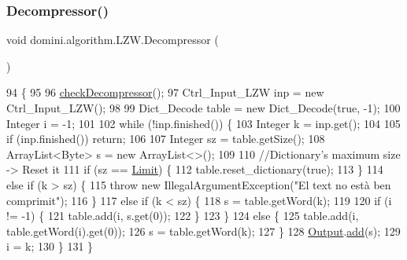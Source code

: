 \subsubsection{\texorpdfstring{Decompressor()}{Decompressor()}}
{\footnotesize\ttfamily void domini.\+algorithm.\+L\+Z\+W.\+Decompressor (\begin{DoxyParamCaption}{ }\end{DoxyParamCaption})\hspace{0.3cm}{\ttfamily [inline]}}


\begin{DoxyCode}
94                                \{
95 
96         \hyperlink{classdomini_1_1algorithm_1_1Algorithm_a6b738342cc7169893fa60d593f5a13db}{checkDecompressor}();
97         Ctrl\_Input\_LZW inp = \textcolor{keyword}{new} Ctrl\_Input\_LZW();
98         
99         Dict\_Decode table = \textcolor{keyword}{new} Dict\_Decode(\textcolor{keyword}{true}, -1);
100         Integer i = -1;
101         
102         \textcolor{keywordflow}{while} (!inp.finished()) \{
103             Integer k = inp.get();
104             
105             \textcolor{keywordflow}{if} (inp.finished()) \textcolor{keywordflow}{return};
106             
107             Integer sz = table.getSize();
108             ArrayList<Byte> s = \textcolor{keyword}{new} ArrayList<>();
109 
110             \textcolor{comment}{//Dictionary's maximum size -> Reset it}
111             \textcolor{keywordflow}{if} (sz == \hyperlink{classdomini_1_1algorithm_1_1LZW_a6d83dbcda4939db767fa0522d40fcc0a}{Limit}) \{ 
112                 table.reset\_dictionary(\textcolor{keyword}{true});
113             \}               
114             \textcolor{keywordflow}{else} \textcolor{keywordflow}{if} (k > sz) \{
115                 \textcolor{keywordflow}{throw} \textcolor{keyword}{new} IllegalArgumentException(\textcolor{stringliteral}{"El text no està ben comprimit"});
116             \}       
117             \textcolor{keywordflow}{else} \textcolor{keywordflow}{if} (k < sz) \{
118                 s = table.getWord(k);
119 
120                 \textcolor{keywordflow}{if} (i != -1) \{
121                     table.add(i, s.get(0));
122                 \}
123             \}
124             \textcolor{keywordflow}{else} \{
125                 table.add(i, table.getWord(i).get(0));
126                 s = table.getWord(k);
127             \}
128             \hyperlink{classdomini_1_1algorithm_1_1Algorithm_a4de9955411c656325adc391ef570c082}{Output}.\hyperlink{classpersistencia_1_1output_1_1Ctrl__Output_a8c5aa5a6acb5259faeb1c05c71ddd21c}{add}(s);
129             i = k;
130         \}
131     \}
\end{DoxyCode}


